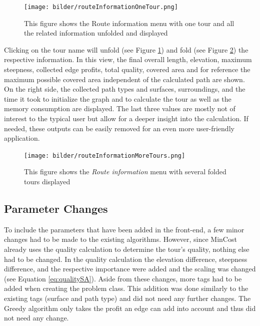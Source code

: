\begin{figure}
	\centering
	\texttt{[image: bilder/routeInformationOneTour.png]}
	\caption{This figure shows the Route information menu with one tour and all the related information unfolded and displayed}
	\label{fig:actualFrontendToureInfoMenuOneTour}
\end{figure}

Clicking on the tour name will unfold (see Figure \ref{fig:actualFrontendToureInfoMenuOneTour}) and fold (see Figure \ref{fig:actualFrontendToureInfoMenuMoreTours}) the respective information.
In this view, the final overall length, elevation, maximum steepness, collected edge profits, total quality, covered area and for reference the maximum possible covered area independent of the calculated path are shown.
On the right side, the collected path types and surfaces, surroundings, and the time it took to initialize the graph and to calculate the tour as well as the memory consumption are displayed.
The last three values are mostly not of interest to the typical user but allow for a deeper insight into the calculation. 
If needed, these outputs can be easily removed for an even more user-friendly application.


\begin{figure}
	\centering
	\texttt{[image: bilder/routeInformationMoreTours.png]}
	\caption{This figure shows the \textit{Route information} menu with several folded tours displayed}
	\label{fig:actualFrontendToureInfoMenuMoreTours}
\end{figure}




\subsection{Parameter Changes}
\label{subsec:parameterChanges}

To include the parameters that have been added in the front-end, a few minor changes had to be made to the existing algorithms. 
However, since MinCost already uses the quality calculation to determine the tour's quality, nothing else had to be changed.
In the quality calculation the elevation difference, steepness difference, and the respective importance were added and the scaling was changed (see Equation \ref{eq:qualitySA}).
Aside from these changes, more tags had to be added when creating the problem class.
This addition was done similarly to the existing tags (surface and path type) and did not need any further changes.
The Greedy algorithm only takes the profit an edge can add into account and thus did not need any change.


